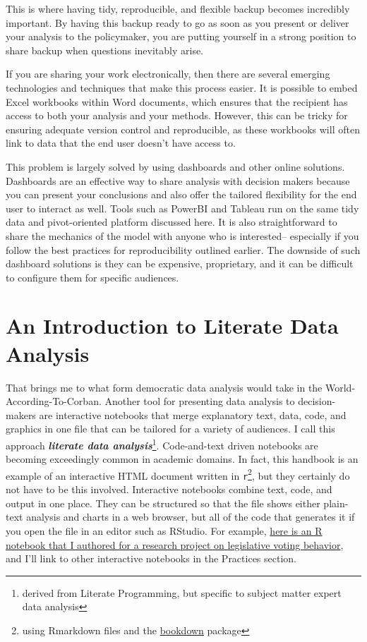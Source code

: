 \documentclass[
]{book}
\begin{document}
This is where having tidy, reproducible, and flexible backup becomes incredibly important. By having this backup ready to go as soon as you present or deliver your analysis to the policymaker, you are putting yourself in a strong position to share backup when questions inevitably arise.

If you are sharing your work electronically, then there are several emerging technologies and techniques that make this process easier. It is possible to embed Excel workbooks within Word documents, which ensures that the recipient has access to both your analysis and your methods. However, this can be tricky for ensuring adequate version control and reproducible, as these workbooks will often link to data that the end user doesn't have access to.

This problem is largely solved by using dashboards and other online solutions. Dashboards are an effective way to share analysis with decision makers because you can present your conclusions and also offer the tailored flexibility for the end user to interact as well. Tools such as PowerBI and Tableau run on the same tidy data and pivot-oriented platform discussed here. It is also straightforward to share the mechanics of the model with anyone who is interested-- especially if you follow the best practices for reproducibility outlined earlier. The downside of such dashboard solutions is they can be expensive, proprietary, and it can be difficult to configure them for specific audiences.

\hypertarget{an-introduction-to-literate-data-analysis}{%
\section{An Introduction to Literate Data Analysis}\label{an-introduction-to-literate-data-analysis}}

That brings me to what form democratic data analysis would take in the World-According-To-Corban. Another tool for presenting data analysis to decision-makers are interactive notebooks that merge explanatory text, data, code, and graphics in one file that can be tailored for a variety of audiences. I call this approach \textbf{\emph{literate data analysis}}\footnote{derived from Literate Programming, but specific to subject matter expert data analysis}. Code-and-text driven notebooks are becoming exceedingly common in academic domains. In fact, this handbook is an example of an interactive HTML document written in \texttt{r}\footnote{using Rmarkdown files and the \href{bookdown.org}{bookdown} package}, but they certainly do not have to be this involved. Interactive notebooks combine text, code, and output in one place. They can be structured so that the file shows either plain-text analysis and charts in a web browser, but all of the code that generates it if you open the file in an editor such as RStudio. For example, \href{https://nemethc.com/evaluating_legislator_efficiency.nb.html\#}{here is an R notebook that I authored for a research project on legislative voting behavior}, and I'll link to other interactive notebooks in the Practices section.
\end{document}
